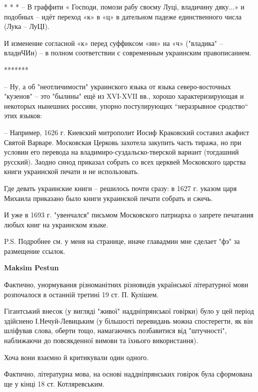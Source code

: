 \begin{itemize}
* * *
– В граффити « Господи, помози рабу своєму Луці, владичину дяку...» и подобных –
идёт переход «к» в «ц» в дательном падеже единственного числа (Лука – ЛуЦІ).

И изменение согласной «к» перед суффиксом «ин» на «ч» ("владика" – владиЧИн) –
в полном соответствии с современным украинским правописанием.

*******

– Ну, а об "неотличимости" украинского языка от языка северо-восточных
"кузенов" – это "былины" ещё из XVI-XVII вв., хорошо характеризирующая и
некоторых нынешних россиян, упорно постулирующих “неразрывное сродство“ этих
языков:

– Например, 1626 г. Киевский митрополит Иосиф Краковский составил акафист
Святой Варваре. Московская Церковь захотела закупить часть тиража, но при
условии его перевода на владимиро-суздальско-тверской вариант (тогдашний
русский). Заодно синод приказал собрать со всех церквей Московского царства
книги украинской печати и не использовать.

Где девать украинские книги – решилось почти сразу: в 1627 г. указом царя
Михаила приказано было книги украинской печати собрать и сжечь.

И уже в 1693 г. "увенчался" письмом Московского патриарха о запрете печатания
любых книг на украинском языке.

P.S. Подробнее см. у меня на странице, иначе главадмин мне сделает "фэ" за
размещение ссылок.

 
\textbf{Maksim Pestun}

Фактично, унормування різноманітних різновидів української літературної мови
розпочалося в останній третині 19 ст. П. Кулішем.

Гігантський внесок (у вигляді "живої" наддніпрянської говірки) було у цей
період здійснено І.Нечуй-Левицьким (у більшості перевидань можна спостерегти,
як він шліфував слова, оберти тощо, намагаючись позбавитися від "штучності",
наближаючи до повсякденної вимови та їхнього використання).

Хоча вони взаємно й критикували один одного.

Фактично, літературна мова, на основі наддніпрянських говірок була сформована
ще у кінці 18 ст. Котляревським.


\end{itemize}
